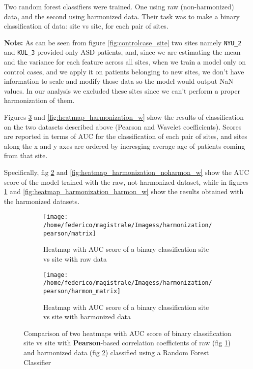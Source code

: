 \documentclass[10pt]{report}
\begin{document}
Two random forest classifiers were trained. One using raw (non-harmonized) data, and the second using harmonized data.
Their task was to make a binary classification of data: site vs site, for each pair of sites.


\textbf{Note:} As can be seen from figure \ref{fig:controlcase_site} two sites namely \texttt{NYU\_2} and \texttt{KUL\_3} provided only ASD patients, and, since we are estimating the mean and the variance for each feature across all sites, when we train a model only on control cases, and we apply it on patients belonging to new sites, we don't have information to scale and modify those data so the model would output NaN values.
In our analysis we excluded these sites since we can't perform a proper harmonization of them.
\newline

Figures \ref{fig:heatmap_harmonization} and \ref{fig:heatmap_harmonization_w} show the results of classification on the two datasets described above (Pearson and Wavelet coefficients). Scores are reported in terms of AUC for the classification of each pair of sites, and sites along the x and y axes are ordered by incresging average age of patients coming from that site.

Specifically, fig \ref{fig:heatmap_harmonization_noharmon} and \ref{fig:heatmap_harmonization_noharmon_w} show the AUC score of the model trained with the raw, not harmonized dataset,  while in figures
\ref{fig:heatmap_harmonization_harmon} and \ref{fig:heatmap_harmonization_harmon_w}
show the results obtained with the harmonized datasets.





\begin{figure}
\centering
\begin{subfigure}[b]{0.8\textwidth}
   \texttt{[image: /home/federico/magistrale/Imagess/harmonization/pearson/matrix]}
   \caption{Heatmap with AUC score of a binary classification site vs site with raw data}
   \label{fig:heatmap_harmonization_harmon}
\end{subfigure}

\begin{subfigure}[b]{0.8\textwidth}
   \texttt{[image: /home/federico/magistrale/Imagess/harmonization/pearson/harmon\_matrix]}
   \caption{Heatmap with AUC score of a binary classification site vs site with harmonized data}
   \label{fig:heatmap_harmonization_noharmon}
\end{subfigure}

\caption{Comparison of two heatmaps with AUC score of binary classification site vs site with \textbf{Pearson}-based correlation coefficients of raw (fig \ref{fig:heatmap_harmonization_harmon}) and harmonized data (fig \ref{fig:heatmap_harmonization_noharmon}) classified using a Random Forest Classifier
}
\label{fig:heatmap_harmonization}
\end{figure}
\end{document}
